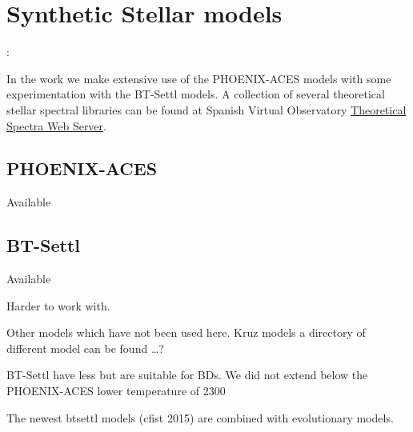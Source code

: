 
\section{Synthetic Stellar models}:

In the work we make extensive use of the {PHOENIX-ACES} models with some experimentation with the {BT-Settl} models.
A collection of several theoretical stellar spectral libraries can be found at Spanish Virtual Observatory \href{http://svo2.cab.inta-csic.es/theory/newov/index.php}{Theoretical Spectra Web Server}.



\subsection{PHOENIX-ACES}

Available 




\subsection{BT-Settl}
\label{subsec:btsettl}
Available 

Harder to work with.

Other models which have not been used here.
Kruz models a directory of different model can be found \ldots{}?

BT-Settl have less but are suitable for BDs.
We did not extend below the {PHOENIX-ACES} lower temperature of 2300\K{}


The newest btsettl models (cfist 2015) are combined with evolutionary models. \citep{barrafe_evolutionary_2015}